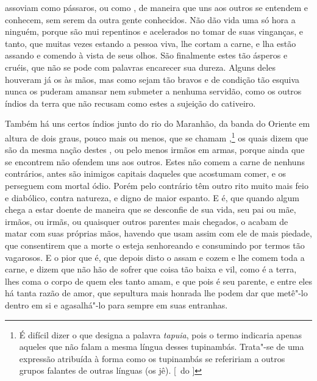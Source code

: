 assoviam como pássaros, ou como , de maneira que uns aos outros
se entendem e conhecem, sem serem da outra gente conhecidos. Não dão
vida uma só hora a ninguém, porque são mui repentinos e acelerados no
tomar de suas vinganças, e tanto, que muitas vezes estando a pessoa
viva, lhe cortam a carne, e lha estão assando e comendo à vista de seus \EP[1]
olhos. São finalmente estes  tão ásperos e cruéis, que não se
pode com palavras encarecer sua dureza. Alguns deles houveram já os			%
 às mãos, mas como sejam tão bravos e de condição tão
esquiva nunca os puderam amansar nem submeter a nenhuma servidão, como os		
outros índios da terra que não recusam como estes a sujeição do cativeiro.

Também há uns certos índios junto do rio do Maranhão, da banda do		%
Oriente em altura de dois graus, pouco mais ou menos, que se chamam
,\footnote{É difícil dizer o que designa a palavra \textit{tapuia},  
pois o termo indicaria apenas aqueles que não falam a mesma língua desses tupinambás. Trata"-se de uma
expressão atribuída à forma como os tupinambás se refeririam a outros
grupos falantes de outras línguas (os jê). [~do ]}  
os quais dizem que são da mesma nação destes , ou pelo %
menos irmãos em armas, porque ainda que se encontrem não ofendem uns			%
aos outros. Estes  não comem a carne de nenhuns contrários, 
antes são inimigos capitais daqueles que acostumam comer, e os
perseguem com mortal ódio. Porém pelo contrário têm outro rito muito
mais feio e diabólico, contra natureza, e digno de maior espanto. E é,
que quando algum chega a estar doente de maneira que se desconfie de
sua vida, seu pai ou mãe, irmãos, ou irmãs, ou quaisquer outros
parentes mais chegados, o acabam de matar com suas próprias mãos,			%
havendo que usam assim com ele de mais piedade, que consentirem que a
morte o esteja senhoreando e consumindo por termos tão vagarosos. E o
pior que é, que depois disto o assam e cozem e lhe comem toda a carne,
e dizem que não hão de sofrer que coisa tão baixa e vil, como é a
terra, lhes coma o corpo de quem eles tanto amam, e que pois é seu
parente, e entre eles há tanta razão de amor, que sepultura mais
honrada lhe podem dar que metê"-lo dentro em si e agasalhá"-lo para			%
sempre em suas entranhas.

